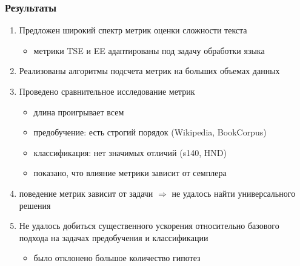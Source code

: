 \documentclass{beamer}
\begin{document}
\begin{frame}
	\frametitle{Результаты}
	\begin{enumerate}
		\item Предложен широкий спектр метрик оценки сложности текста
		\begin{itemize}
			\item метрики TSE и EE адаптированы под задачу обработки языка
		\end{itemize}
		\item Реализованы алгоритмы подсчета метрик на больших объемах данных
		\item Проведено сравнительное исследование метрик
			\begin{itemize}
				\item длина проигрывает всем
				\item предобучение: есть строгий порядок (Wikipedia, BookCorpus)
				\item классификация: нет значимых отличий (s140, HND)
			\end{itemize}
		\begin{itemize}
			\item показано, что влияние метрики зависит от семплера
		\end{itemize}
		\item поведение метрик зависит от задачи $\Rightarrow$ не удалось найти универсального решения
		\item Не удалось добиться существенного ускорения относительно базового подхода на задачах предобучения и классификации
			\begin{itemize}
				\item было отклонено большое количество гипотез
			\end{itemize}
	\end{enumerate}
\end{frame}

\appendix
\end{document}

